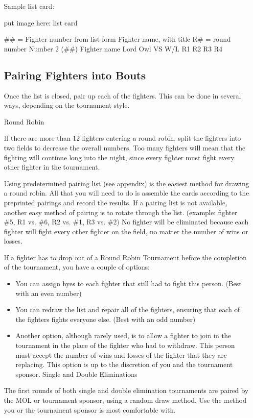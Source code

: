 \documentclass{article}
\begin{document}
Sample list card:

put image here: list card

\#\# = Fighter number from list form
Fighter name, with title
R\# = round number
Number 2 (\#\#)
Fighter name
Lord Owl
VS W/L
R1
R2
R3
R4


\subsection{Pairing Fighters into Bouts}
Once the list is closed, pair up each of the fighters. This can be done in several ways, depending on the
tournament style.

Round Robin

If there are more than 12 fighters entering a round robin, split the fighters into two fields to decrease the
overall numbers. Too many fighters will mean that the fighting will continue long into the night, since
every fighter must fight every other fighter in the tournament.

Using predetermined pairing list (see appendix) is the easiest method for drawing a round robin. All that
you will need to do is assemble the cards according to the preprinted pairings and record the results. If a
pairing list is not available, another easy method of pairing is to rotate through the list. (example: fighter
\#5, R1 vs. \#6, R2 vs. \#1, R3 vs. \#2) No fighter will be eliminated because each fighter will fight every
other fighter on the field, no matter the number of wins or losses.

If a fighter has to drop out of a Round Robin Tournament before the completion of the tournament, you
have a couple of options:
\begin{itemize}
\item You can assign byes to each fighter that still had to fight this person. (Best with an even number)

\item You can redraw the list and repair all of the fighters, ensuring that each of the fighters fights everyone
else. (Best with an odd number)

\item Another option, although rarely used, is to allow a fighter to join in the tournament in the place of the
fighter who had to withdraw. This person must accept the number of wins and losses of the fighter that
they are replacing. This option is up to the discretion of you and the tournament sponsor.
Single and Double Eliminations
\end{itemize}
The first rounds of both single and double elimination tournaments are paired by the MOL or tournament
sponsor, using a random draw method. Use the method you or the tournament sponsor is most
comfortable with.
\end{document}

